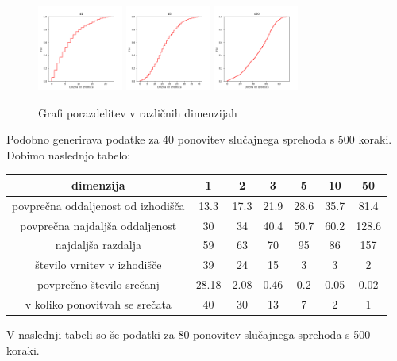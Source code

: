\documentclass[a4paper,oneside,12pt]{article}
\begin{document}
\begin{figure}[h]
    \centering
    \includegraphics[width=0.25\textwidth]{graf1-1}
    \includegraphics[width=0.25\textwidth]{graf5-1}  \includegraphics[width=0.25\textwidth]{graf50-1}
    \caption{Grafi porazdelitev v različnih dimenzijah}
\end{figure}
\bigskip
Podobno generirava podatke za 40 ponovitev slučajnega sprehoda s 500 koraki. Dobimo naslednjo tabelo: 

\begin{center}
\begin{tabular}{|c| c c c c c c|} 
\hline
dimenzija & 1 & 2 & 3 & 5 & 10 & 50 \\ [0.5ex] 
\hline \hline 
povprečna oddaljenost od izhodišča & 13.3 & 17.3 & 21.9 & 28.6 & 35.7 & 81.4 \\ [0.5ex] 
\hline
povprečna najdaljša oddaljenost & 30 & 34 & 40.4 & 50.7 & 60.2 & 128.6  \\ [0.5ex] 
\hline
najdaljša razdalja & 59 & 63 & 70 & 95 & 86 & 157 \\ [0.5ex] 
\hline
število vrnitev v izhodišče & 39 & 24 & 15 & 3 & 3 & 2 \\ [0.5ex] 
\hline
povprečno število srečanj & 28.18 & 2.08 & 0.46 & 0.2 & 0.05 & 0.02 \\ [0.5ex] 
\hline
v koliko ponovitvah se srečata & 40 & 30 & 13 & 7 & 2 & 1 \\ [0.5ex] 
\hline
\end{tabular}
\end{center}
\bigskip 
V naslednji tabeli so še podatki za 80 ponovitev slučajnega sprehoda s 500 koraki.
\end{document}
